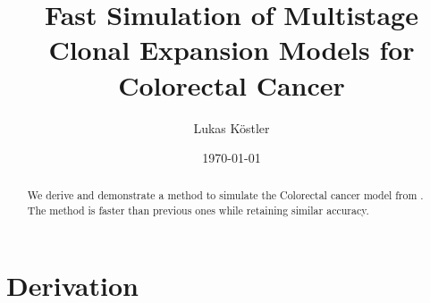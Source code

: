 \documentclass{amsart}
\numberwithin{equation}{section}
\begin{document}
\title{Fast Simulation of Multistage Clonal Expansion Models for Colorectal Cancer}


\author{Lukas K\"ostler}
\address{Technical University of Munich (TUM)}



\date{\today}


\begin{abstract}
We derive and demonstrate a method to simulate the Colorectal cancer model from \cite{jeon2008evaluation}. The method is faster than previous ones while retaining similar accuracy.
\end{abstract}

\maketitle


\section{Derivation}
\end{document}
